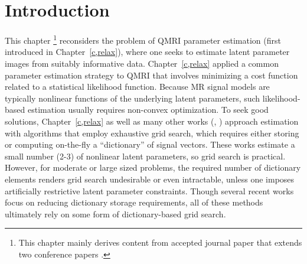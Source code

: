
\section{Introduction}
\label{s,perk,intro}


This chapter
\footnote{%
	This chapter mainly derives content
	from accepted journal paper \cite{nataraj::dfm}
	that extends two conference papers
	\cite{nataraj:17:dfm,nataraj:17:slw}.
} 
reconsiders the problem
of QMRI parameter estimation
(first introduced in Chapter~\ref{c,relax}),
where one seeks to estimate latent parameter images 
from suitably informative data.
Chapter~\ref{c,relax} applied
a common parameter estimation strategy to QMRI
that involves minimizing a cost function
related to a statistical likelihood function.
Because MR signal models are typically nonlinear functions
of the underlying latent parameters,
such likelihood-based estimation
usually requires non-convex optimization.
To seek good solutions,
Chapter~\ref{c,relax}
as well as many other works
(\eg, 
\cite{%
	haldar:07:mle,%
	hernando:08:jeo,%
	barral:10:arm,%
	staroswiecki:12:seo,%
	ma:13:mrf,%
	trzasko:13:etf,%
	mcgivney:14:scf,%
	zhao:14:mbm,%
	beneliezer:15:raa,%
		zhao:15:amp,%
	cauley:15:fgm,%
	zhao:16:mlr,%
	nataraj:17:oms,%
	asslander:18:lra,%
	yang:18:lra%
})
approach estimation
with algorithms
that employ exhaustive grid search,
which requires either storing
or computing on-the-fly 
a ``dictionary'' of signal vectors.
These works estimate a small number (2-3)
of nonlinear latent parameters,
so grid search is practical.
However, 
for moderate or large sized problems,
the required number 
of dictionary elements
renders grid search undesirable or even intractable,
unless one imposes artificially restrictive latent parameter constraints.
Though several recent works
\cite{%
	mcgivney:14:scf,%
	cauley:15:fgm,%
	asslander:18:lra,%
	yang:18:lra%
}
focus on reducing dictionary storage requirements,
all of these methods ultimately rely 
on some form of dictionary-based grid search.

